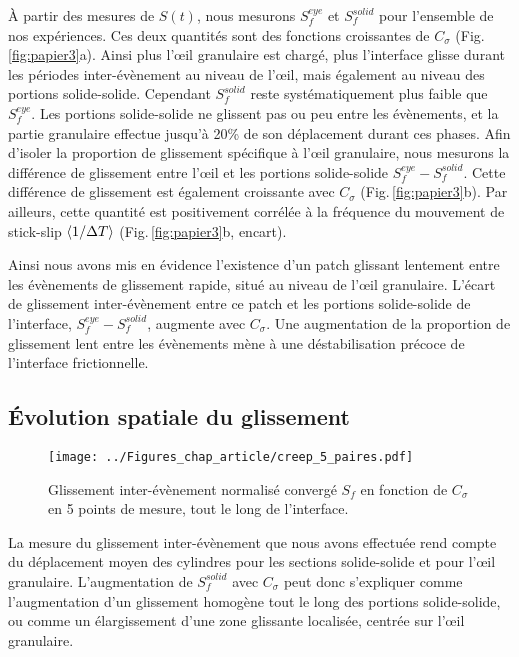 À partir des mesures de $S(t)$, nous mesurons $S_f^{eye}$ et $S_f^{solid}$ pour l'ensemble de nos expériences. Ces deux quantités sont des fonctions croissantes de $C_\sigma$ (Fig.\,\ref{fig:papier3}a). Ainsi plus l'œil granulaire est chargé, plus l'interface glisse durant les périodes inter-évènement au niveau de l'œil, mais également au niveau des portions solide-solide. Cependant $S_f^{solid}$ reste systématiquement plus faible que $S_f^{eye}$. Les portions solide-solide ne glissent pas ou peu entre les évènements, et la partie granulaire effectue jusqu'à 20\% de son déplacement durant ces phases. Afin d'isoler la proportion de glissement spécifique à l'œil granulaire, nous mesurons la différence de glissement entre l'œil et les portions solide-solide $S_f^{eye}-S_f^{solid}$. Cette différence de glissement est également croissante avec $C_\sigma$ (Fig.\,\ref{fig:papier3}b). Par ailleurs, cette quantité est positivement corrélée à la fréquence du mouvement de stick-slip $\left\langle {1/\Delta T} \right\rangle$ (Fig.\,\ref{fig:papier3}b, encart).


Ainsi nous avons mis en évidence l'existence d'un patch glissant lentement entre les évènements de glissement rapide, situé au niveau de l'œil granulaire. L'écart de glissement inter-évènement entre ce patch et les portions solide-solide de l'interface, $S_f^{eye}-S_f^{solid}$, augmente avec $C_\sigma$. Une augmentation de la proportion de glissement lent entre les évènements mène à une déstabilisation précoce de l'interface frictionnelle.


\subsection{Évolution spatiale du glissement}

\begin{figure}[htb]
\centering
\texttt{[image: ../Figures\_chap\_article/creep\_5\_paires.pdf]}
\caption[Glissement inter-évènement le long de l'interface]{Glissement inter-évènement normalisé convergé $S_f$ en fonction de $C_\sigma$ en 5 points de mesure, tout le long de l'interface.}
\label{fig:creep_5_paires}
\end{figure}



La mesure du glissement inter-évènement que nous avons effectuée rend compte du déplacement moyen des cylindres pour les sections solide-solide et pour l'œil granulaire. L'augmentation de $S_f^{solid}$ avec $C_\sigma$ peut donc s'expliquer comme l'augmentation d'un glissement homogène tout le long des portions solide-solide, ou comme un élargissement d'une zone glissante localisée, centrée sur l'œil granulaire.

